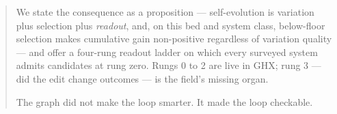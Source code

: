 \begin{abstract}
We state the consequence as a proposition --- self-evolution is variation
plus selection plus \emph{readout}, and, on this bed and system class,
below-floor selection makes cumulative gain non-positive regardless of
variation quality --- and offer a four-rung readout ladder on which every surveyed system admits
candidates at rung zero. Rungs 0 to 2 are live in GHX; rung 3 --- did the
edit change outcomes --- is the field's missing organ.

The graph did not make the loop smarter. It made the loop checkable.
\end{abstract}
